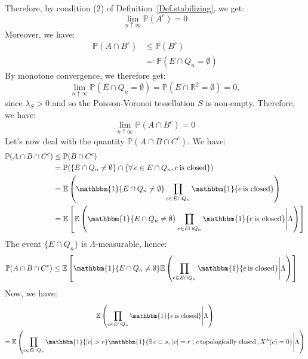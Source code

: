 \documentclass[10pt,a4paper]{amsart}
\theoremstyle{exampstyle}
\theoremstyle{exampnotations}
\begin{document}
Therefore, by condition (2) of Definition~\ref{Def.stabilizing}, we get:
\begin{equation}
    \label{eq13}
    \lim_{n \uparrow \infty} \mathbb{P}(A^c) = 0
\end{equation}
Moreover, we have: 
\begin{align*}
    \mathbb{P}(A \cap B^c) & \leq \mathbb{P}(B^c)
    \\ & \eqqcolon \mathbb{P}(E \cap Q_n = \emptyset)
\end{align*}
By monotone convergence, we therefore get:
\begin{equation*}
    \lim_{n \uparrow \infty}\mathbb{P}(E \cap Q_n = \emptyset) = \mathbb{P}(E \cap \mathbb{R}^{2} = \emptyset) = 0,
\end{equation*}
since $\lambda_S > 0$ and so the Poisson-Voronoi tessellation $S$ is non-empty. Therefore, we have:
\begin{equation}
    \label{eq14}
    \lim_{n \uparrow \infty}\mathbb{P}(A \cap B^c) = 0
\end{equation}
Let's now deal with the quantity $\mathbb{P}(A \cap B \cap C^c)$. We have:
\begin{align*}
    \mathbb{P}(A \cap B \cap C^c) &\leq \mathbb{P}(B \cap C^c)
    \\ &= \mathbb{P}(\lbrace E \cap Q_n \neq \emptyset \rbrace \cap \lbrace \forall \, e \in E \cap Q_n, e \, \text{is closed} \rbrace)
    \\ &= \mathbb{E}\left( \mathbbm{1}\lbrace E \cap Q_n \neq \emptyset \rbrace \prod_{e \in E \cap Q_n} \mathbbm{1} \lbrace e \, \text{is closed} \rbrace \right)
    \\ &= \mathbb{E}\left[\mathbb{E}\left(\mathbbm{1}\lbrace E \cap Q_n \neq \emptyset \rbrace \prod_{e \in E \cap Q_n} \mathbbm{1} \lbrace e \, \text{is closed} \rbrace \Bigg\vert \Lambda \right)\right]
\end{align*}
The event $\lbrace E \cap Q_n \rbrace$ is $\Lambda$-measurable, hence:
\begin{align}
\label{eq15}
    \mathbb{P}(A \cap B \cap C^c) &\leq \mathbb{E}\left[\mathbbm{1}\lbrace E \cap Q_n \neq \emptyset \rbrace\mathbb{E}\left( \prod_{e \in E \cap Q_n} \mathbbm{1} \lbrace e \, \text{is closed} \rbrace \Bigg\vert \Lambda \right)\right]
\end{align}
Now, we have:
\begin{gather*}
\mathbb{E}\left( \prod_{e \in E \cap Q_n} \mathbbm{1} \lbrace e \, \text{is closed} \rbrace \Bigg\vert \Lambda \right) \\
=\mathbb{E}\left( \prod_{e \in E \cap Q_n} \mathbbm{1} \lbrace \vert e \vert > r \rbrace \mathbbm{1} \lbrace \exists  \, c \subset s, \, \vert c \vert = r \; , \, c  \, \text{topologically closed} \,  ,  X^{\lambda}(c) = 0 \rbrace \Bigg\vert \Lambda \right)
\end{gather*}
\end{document}
